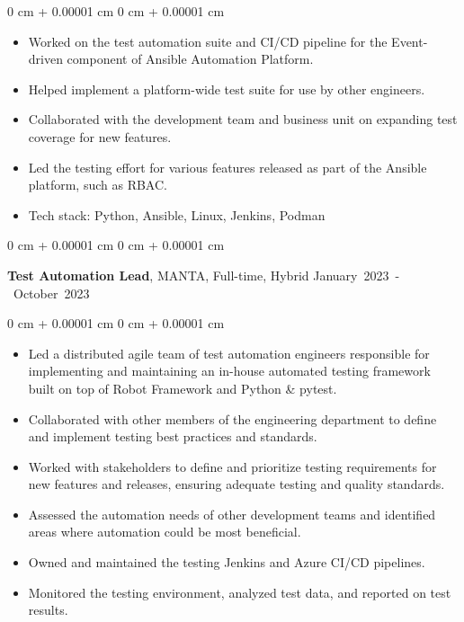 \documentclass[10pt, a4paper]{article}
\newenvironment{highlights}{
    \begin{itemize}[
        topsep=0.05 cm,
        parsep=0.05 cm,
        partopsep=0pt,
        itemsep=0pt,
        leftmargin=0 cm + 10pt
    ]
}{
    \end{itemize}
} %
\newenvironment{onecolentry}{
    \begin{adjustwidth}{
        0 cm + 0.00001 cm
    }{
        0 cm + 0.00001 cm
    }
}{
    \end{adjustwidth}
} %
\newenvironment{twocolentry}[2][]{
    \onecolentry
    \def\secondColumn{#2}
    \setcolumnwidth{\fill, 4.5 cm}
    \begin{paracol}{2}
}{
    \switchcolumn \raggedleft \secondColumn
    \end{paracol}
    \endonecolentry
} %
\begin{document}
        \begin{onecolentry}
            \begin{highlights}
                \item Worked on the test automation suite and CI/CD pipeline for the Event-driven component of Ansible Automation Platform.
                \item Helped implement a platform-wide test suite for use by other engineers.
                \item Collaborated with the development team and business unit on expanding test coverage for new features.
                \item Led the testing effort for various features released as part of the Ansible platform, such as RBAC.
                \item Tech stack: Python, Ansible, Linux, Jenkins, Podman
            \end{highlights}
        \end{onecolentry}

        \vspace{0.5 cm}

        \begin{twocolentry}{
            \small\mbox{January 2023 - October 2023}
        }
            \textbf{Test Automation Lead}, MANTA, Full-time, Hybrid\end{twocolentry}

        \vspace{0.10 cm}
        \begin{onecolentry}
            \begin{highlights}
                \item Led a distributed agile team of test automation engineers responsible for implementing and maintaining an in-house automated testing framework built on top of Robot Framework and Python \& pytest.
                \item Collaborated with other members of the engineering department to define and implement testing best practices and standards.
                \item Worked with stakeholders to define and prioritize testing requirements for new features and releases, ensuring adequate testing and quality standards.
                \item Assessed the automation needs of other development teams and identified areas where automation could be most beneficial.
                \item Owned and maintained the testing Jenkins and Azure CI/CD pipelines.
                \item Monitored the testing environment, analyzed test data, and reported on test results.
            \end{highlights}
        \end{onecolentry}
\end{document}

